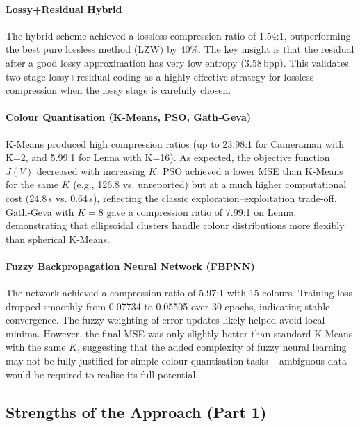\paragraph{Lossy+Residual Hybrid}  
The hybrid scheme achieved a lossless compression ratio of 1.54:1, outperforming the best pure lossless method (LZW) by 40\%. The key insight is that the residual after a good lossy approximation has very low entropy (3.58 bpp). This validates two‑stage lossy+residual coding as a highly effective strategy for lossless compression when the lossy stage is carefully chosen.

\paragraph{Colour Quantisation (K‑Means, PSO, Gath‑Geva)}  
K‑Means produced high compression ratios (up to 23.98:1 for Cameraman with K=2, and 5.99:1 for Lenna with K=16). As expected, the objective function \(J(V)\) decreased with increasing \(K\). PSO achieved a lower MSE than K‑Means for the same \(K\) (e.g., 126.8 vs. unreported) but at a much higher computational cost (24.8 s vs. 0.64 s), reflecting the classic exploration–exploitation trade‑off. Gath‑Geva with \(K=8\) gave a compression ratio of 7.99:1 on Lenna, demonstrating that ellipsoidal clusters handle colour distributions more flexibly than spherical K‑Means.

\paragraph{Fuzzy Backpropagation Neural Network (FBPNN)}  
The network achieved a compression ratio of 5.97:1 with 15 colours. Training loss dropped smoothly from 0.07734 to 0.05505 over 30 epochs, indicating stable convergence. The fuzzy weighting of error updates likely helped avoid local minima. However, the final MSE was only slightly better than standard K‑Means with the same \(K\), suggesting that the added complexity of fuzzy neural learning may not be fully justified for simple colour quantisation tasks – ambiguous data would be required to realise its full potential.

\subsection{Strengths of the Approach (Part 1)}

